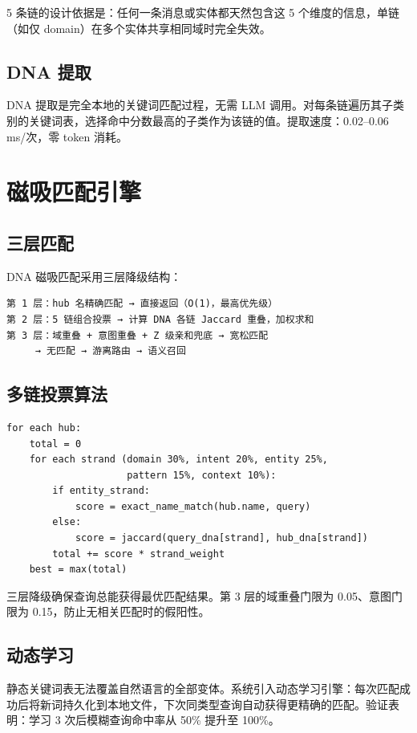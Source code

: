 \documentclass[11pt,a4paper]{article}
\begin{document}
5 条链的设计依据是：任何一条消息或实体都天然包含这 5 个维度的信息，单链（如仅 domain）在多个实体共享相同域时完全失效。

\subsection{DNA 提取}
DNA 提取是完全本地的关键词匹配过程，无需 LLM 调用。对每条链遍历其子类别的关键词表，选择命中分数最高的子类作为该链的值。提取速度：0.02--0.06 ms/次，零 token 消耗。

\section{磁吸匹配引擎}

\subsection{三层匹配}
DNA 磁吸匹配采用三层降级结构：

\begin{verbatim}
第 1 层：hub 名精确匹配 → 直接返回（O(1)，最高优先级）
第 2 层：5 链组合投票 → 计算 DNA 各链 Jaccard 重叠，加权求和
第 3 层：域重叠 + 意图重叠 + Z 级亲和兜底 → 宽松匹配
     → 无匹配 → 游离路由 → 语义召回
\end{verbatim}

\subsection{多链投票算法}

\begin{verbatim}
for each hub:
    total = 0
    for each strand (domain 30%, intent 20%, entity 25%,
                     pattern 15%, context 10%):
        if entity_strand:
            score = exact_name_match(hub.name, query)
        else:
            score = jaccard(query_dna[strand], hub_dna[strand])
        total += score * strand_weight
    best = max(total)
\end{verbatim}

三层降级确保查询总能获得最优匹配结果。第 3 层的域重叠门限为 0.05、意图门限为 0.15，防止无相关匹配时的假阳性。

\subsection{动态学习}
静态关键词表无法覆盖自然语言的全部变体。系统引入动态学习引擎：每次匹配成功后将新词持久化到本地文件，下次同类型查询自动获得更精确的匹配。验证表明：学习 3 次后模糊查询命中率从 50\% 提升至 100\%。
\end{document}
